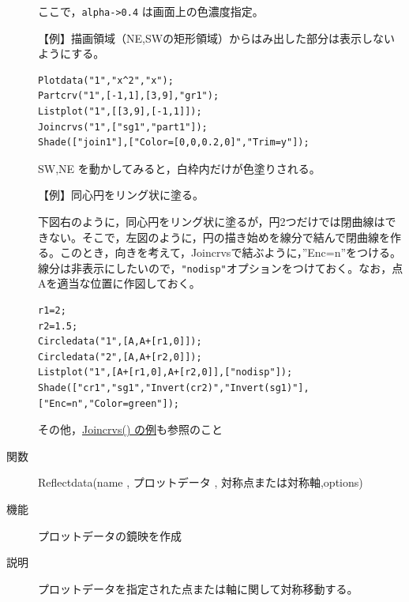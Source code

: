 \documentclass[papersize,a4paper,10pt,uplatex]{jsarticle}
\begin{document}
\begin{description}
ここで，\verb|alpha->0.4| は画面上の色濃度指定。

\vspace{\baselineskip}
\begin{center}\scalebox{0.9}{} \end{center}

\vspace{\baselineskip}
【例】描画領域（NE,SWの矩形領域）からはみ出した部分は表示しないようにする。

\begin{verbatim}
Plotdata("1","x^2","x");
Partcrv("1",[-1,1],[3,9],"gr1");
Listplot("1",[[3,9],[-1,1]]);
Joincrvs("1",["sg1","part1"]);
Shade(["join1"],["Color=[0,0,0.2,0]","Trim=y"]);
\end{verbatim}

SW,NE を動かしてみると，白枠内だけが色塗りされる。

\vspace{\baselineskip}
【例】同心円をリング状に塗る。

下図右のように，同心円をリング状に塗るが，円2つだけでは閉曲線はできない。そこで，左図のように，円の描き始めを線分で結んで閉曲線を作る。このとき，向きを考えて，Joincrvsで結ぶように，''Enc=n''をつける。線分は非表示にしたいので，\verb|"nodisp"|オプションをつけておく。なお，点Aを適当な位置に作図しておく。

\begin{verbatim}
r1=2;
r2=1.5;
Circledata("1",[A,A+[r1,0]]);
Circledata("2",[A,A+[r2,0]]);
Listplot("1",[A+[r1,0],A+[r2,0]],["nodisp"]);
Shade(["cr1","sg1","Invert(cr2)","Invert(sg1)"],["Enc=n","Color=green"]);
\end{verbatim}
\begin{center} \end{center}

その他，\hyperlink{joincrvs}{Joincrvs() の例}も参照のこと


\vspace{\baselineskip}
\hypertarget{reflectdata}{}
\item[関数]Reflectdata(name , プロットデータ , 対称点または対称軸,options)
\item[機能]プロットデータの鏡映を作成
\item[説明]プロットデータを指定された点または軸に関して対称移動する。


\end{description}
\end{document}
